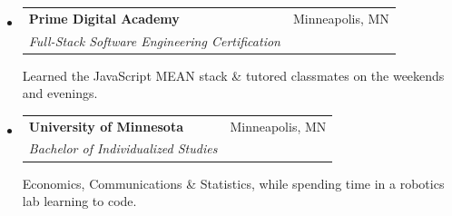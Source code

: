 \documentclass[letterpaper,11pt]{article}
\makeatletter
\newcommand{\resitem}[1]{\item #1 \vspace{-3pt}}
\newcommand{\ressubheading}[4]{
\begin{tabular*}{6.75in}{l@{\extracolsep{\fill}}r}
		\textbf{#1} & #2 \\
		\textit{#3} & \textit{#4} \\
\end{tabular*}\vspace{-6pt}}
\makeatother
\begin{document}
\begin{itemize}[label={}]
\item
	\ressubheading{Prime Digital Academy}{Minneapolis, MN}{Full-Stack Software Engineering Certification}{}

\vspace{.25cm}

	Learned the JavaScript MEAN stack \& tutored classmates on the weekends and evenings.


\item
	\ressubheading{University of Minnesota}{Minneapolis, MN}{Bachelor of Individualized Studies}{}

\vspace{.25cm}

	Economics, Communications \& Statistics, while spending time in a robotics lab learning to code.



\end{itemize}

\end{document}
